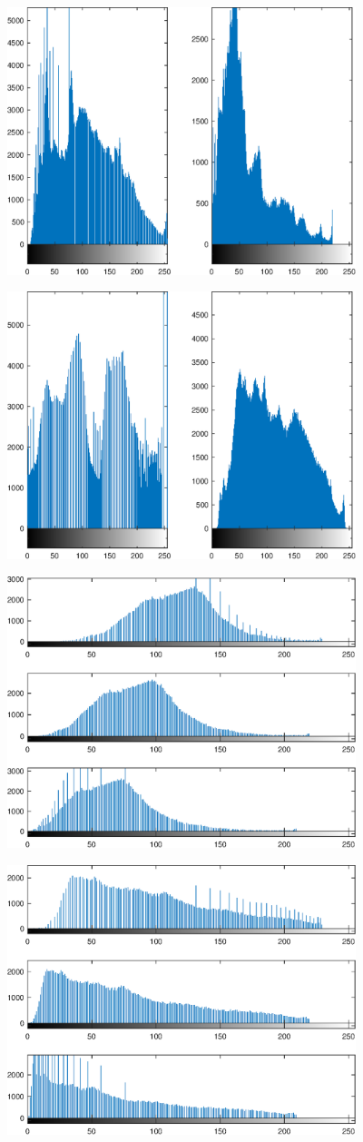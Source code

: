 \documentclass{article}
\begin{document}
\includegraphics [width=4in]{lab6_01.eps}

\includegraphics [width=4in]{lab6_02.eps}

\includegraphics [width=4in]{lab6_03.eps}

\includegraphics [width=4in]{lab6_04.eps}
\end{document}
